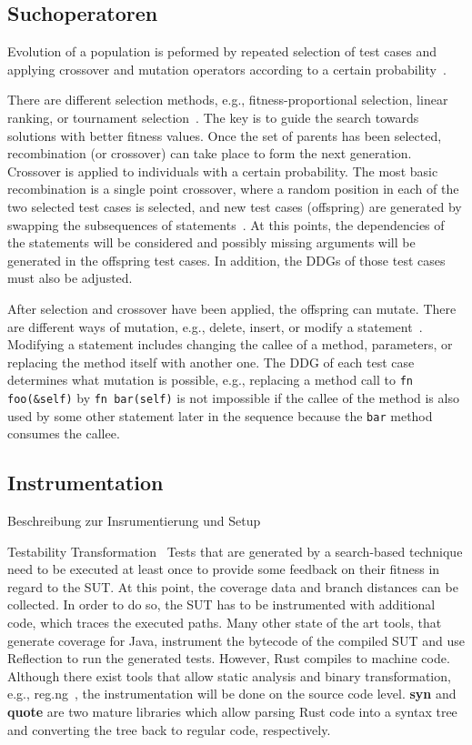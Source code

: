 \documentclass{article}
\begin{document}
\subsection{Suchoperatoren}
Evolution of a population is peformed by repeated selection of test cases and applying crossover and mutation operators according to a certain probability~\cite{Fraser2012}.

There are different selection methods, e.g., fitness-proportional selection, linear ranking, or tournament selection~\cite{McMinn_2004}. The key is to guide the search towards solutions with better fitness values. Once the set of parents has been selected, recombination (or crossover) can take place to form the next generation. Crossover is applied to individuals with a certain probability. The most basic recombination is a single point crossover, where a random position in each of the two selected test cases is selected, and new test cases (offspring) are generated by swapping the subsequences of statements~\cite{Fraser2012}. At this points, the dependencies of the statements will be considered and possibly missing arguments will be generated in the offspring test cases. In addition, the \acp{DDG} of those test cases must also be adjusted.

After selection and crossover have been applied, the offspring can mutate. There are different ways of mutation, e.g., delete, insert, or modify a statement~\cite{Fraser2012}. Modifying a statement includes changing the callee of a method, parameters, or replacing the method itself with another one. The \ac{DDG} of each test case determines what mutation is possible, e.g., replacing a method call to \lstinline{fn foo(&self)} by \lstinline{fn bar(self)} is not impossible if the callee of the method is also used by some other statement later in the sequence because the \lstinline{bar} method consumes the callee. 


\subsection{Instrumentation}
Beschreibung zur Insrumentierung und Setup~\cite{Fraser2012}

Testability Transformation~\cite{McMinn2011,McMinn2009}
Tests that are generated by a search-based technique need to be executed at least once to provide some feedback on their fitness in regard to the \ac{SUT}. At this point, the coverage data and branch distances can be collected. In order to do so, the \ac{SUT} has to be instrumented with additional code, which traces the executed paths. Many other state of the art tools, that generate coverage for Java, instrument the bytecode of the compiled \ac{SUT} and use Reflection to run the generated tests. However, Rust compiles to machine code. Although there exist tools that allow static analysis and binary transformation, e.g., reg.ng~\cite{DiFederico2018}, the instrumentation will be done on the source code level. \textbf{syn} and \textbf{quote} are two mature libraries which allow parsing Rust code into a syntax tree and converting the tree back to regular code, respectively. 
\end{document}
